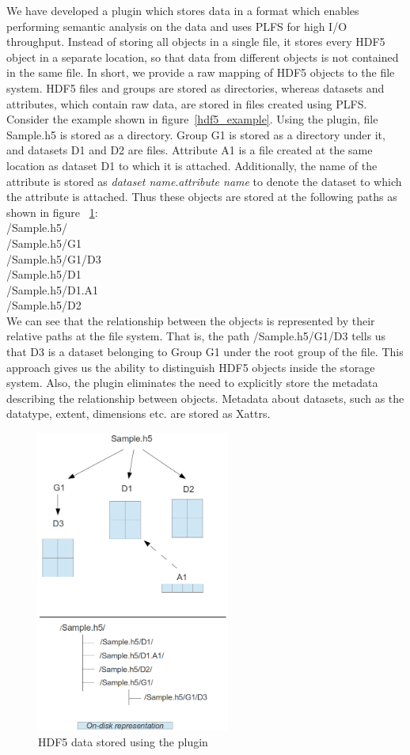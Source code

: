 We have developed a plugin which stores data in a format which enables performing semantic analysis on the data and uses PLFS for high I/O throughput. 
Instead of storing all objects in a single file, it stores every HDF5 object in a separate location, so that data from different objects is not contained in the same file. In short, we provide a raw mapping of HDF5 objects to the file system. 
HDF5 files and groups are stored as directories, whereas datasets and attributes, which contain raw data, are stored in files created using PLFS. 
Consider the example shown in figure~\ref{hdf5_example}. Using the plugin, file Sample.h5 is stored as a directory. Group G1 is stored as a directory under it, and datasets D1 and D2 are files. Attribute A1 is a file created at the same location as dataset D1 to which it is attached. Additionally, the name of the attribute is stored as \textit{dataset name}.\textit{attribute name} to denote the dataset to which the attribute is attached. Thus these objects are stored at the following paths as shown in figure ~\ref{hdf5_example_plugin}:\\
/Sample.h5/\\
/Sample.h5/G1\\
/Sample.h5/G1/D3\\
/Sample.h5/D1\\
/Sample.h5/D1.A1\\
/Sample.h5/D2\\

We can see that the relationship between the objects is represented by their relative paths at the file system. That is, the path /Sample.h5/G1/D3 tells us that D3 is a dataset belonging to Group G1 under the root group of the file. This approach gives us the ability to distinguish HDF5 objects inside the storage system. Also, the plugin eliminates the need to explicitly store the metadata describing the relationship between objects. Metadata about datasets, such as the datatype, extent, dimensions etc. are stored as Xattrs. 
 
\begin{figure}[!t]
\centering
\includegraphics[width=2.5in]{hdf5_example_plugin}
\caption{HDF5 data stored using the plugin}
\label{hdf5_example_plugin}
\end{figure}


